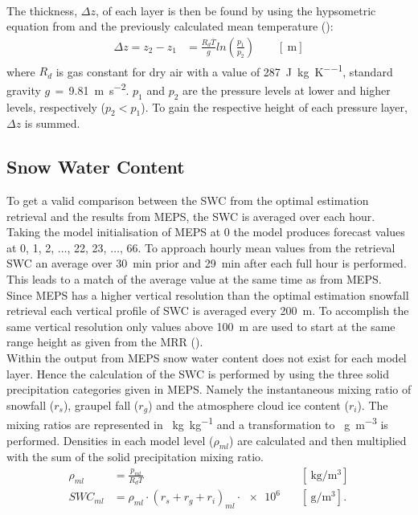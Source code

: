 \\
The thickness, $\Delta z$, of each layer is then be found by using the hypsometric equation from \citet{martin_mid-latitude_2006} and the previously calculated mean temperature ():
\begin{equation}
\begin{split}
\Delta z  = z_2 - z_1 
& = \frac{R_d \overline{T}}{g} ln\left(\frac{p_1}{p_2} \right) \qquad [\SI{}{\metre}]
\end{split}
\label{eq:hypsometric}
\end{equation}
where $R_d$ is gas constant for dry air with a value of \SI{287}{\joule\per\kilogram\per\kelvin},  standard gravity $g\,=\,$\SI{9.81}{\metre\per\square\second}. $p_1$ and $p_2$ are the pressure levels at lower and higher levels, respectively ($p_2 < p_1$).
To gain the respective height of each pressure layer, $\Delta z$ is summed.

\subsection{Snow Water Content}
To get a valid comparison between the SWC from the optimal estimation retrieval and the results from MEPS, the SWC is averaged over each hour. Taking the model initialisation of MEPS at \SI{0}{\UTC} the model produces forecast values at \SI{0}{}, \SI{1}{}, \SI{2}{}, $\ldots$, \SI{22}{}, \SI{23}{}, $\ldots$, \SI{66}{\UTC}. To approach hourly mean values from the retrieval SWC an average over \SI{30}{\minute} prior and \SI{29}{\minute} after each full hour is performed. This leads to a match of the average value at the same time as from MEPS. \\
Since MEPS has a higher vertical resolution than the optimal estimation snowfall retrieval each vertical profile of SWC is averaged every \SI{200}{\metre}. To accomplish the same vertical resolution only values above \SI{100}{\metre} are used to start at the same range height as given from the MRR ().
\\
Within the output from MEPS snow water content does not exist for each model layer. Hence the calculation of the SWC is performed by using the three solid precipitation categories given in MEPS. Namely the instantaneous mixing ratio of snowfall ($r_s$), graupel fall ($r_g$) and the atmosphere cloud ice content ($r_i$). The mixing ratios are represented in \SI{}{\kg\per\kg} and a transformation to \SI{}{\g\per\cubic\meter} is performed. Densities in each model level ($\rho_{ml}$) are calculated and then multiplied with the sum of the solid precipitation mixing ratio. 
\begin{align}
	\rho_{ml} & = \frac{p_{ml}}{R_d T} & \quad [\SI{}{\kg\per\cubic\meter}]  \\
	SWC_{ml} & = \rho_{ml} \cdot (r_s + r_g + r_i)_{ml} \cdot \num{e6} & \quad [\SI{}{\g\per\cubic\meter}].
	\label{eq:SWC_ml}
\end{align}


